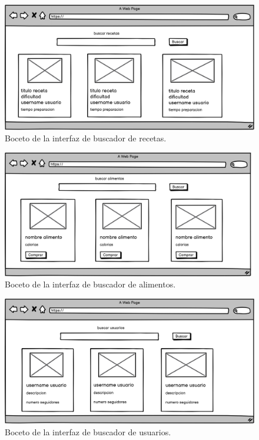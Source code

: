  

      \begin{figure}[H]
    \centering
    \includegraphics[scale=0.20]{img/buscar-receta.jpg}
    \caption{Boceto de la interfaz de buscador de recetas.}
    \label{fig:buscar-receta}
\end{figure}
    
 
    \begin{figure}[H]
    \centering
    \includegraphics[scale=0.20]{img/buscar-alimento.jpg}
    \caption{Boceto de la interfaz de buscador de alimentos.}
    \label{fig:buscar-alimento}
\end{figure}
    
   

    \begin{figure}[H]
    \centering
    \includegraphics[scale=0.20]{img/buscar-usuario.jpg}
    \caption{Boceto de la interfaz de buscador de usuarios.}
    \label{fig:buscar-usuario}
\end{figure}




